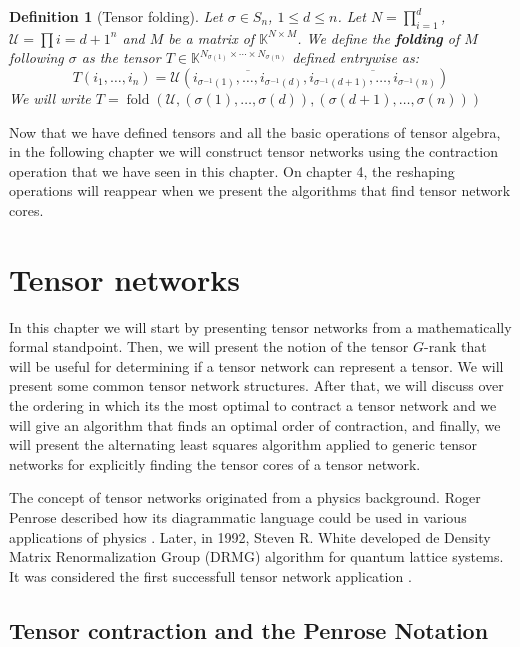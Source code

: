 \documentclass[11pt,a4paper,openright,oneside]{book}
\numberwithin{equation}{section}
\newtheorem{defn0}{Definition}[chapter]
\newenvironment{definition}{ \begin{defn0}}{\end{defn0}}
\DeclareMathOperator{\folding}{fold}
\begin{document}
\begin{definition}[Tensor folding]
    Let $\sigma \in S_n$, $1 \leqslant d \leqslant n$. Let $N = \prod_{i=1}^d$, $\mathcal{U} = \prod{i=d+1}^n$ and $M$ be a matrix of $\mathbb{K}^{N \times M}$.
    We define the \textbf{folding} of $M$ following $\sigma$ as the tensor $T \in \mathbb{K}^{N_{\sigma(1)} \times \cdots \times N_{\sigma(n)}}$ defined entrywise as:
    $$T(i_1, \dots, i_n) = \mathcal{U}(\overline{i_{\sigma^{-1}(1)}, \dots, i_{\sigma^{-1}(d)}}, \overline{i_{\sigma^{-1}(d+1)}, \dots, i_{\sigma^{-1}(n)}})$$
    We will write $T = \folding(\mathcal{U}, (\sigma(1), \dots, \sigma(d)), (\sigma(d+1), \dots, \sigma(n)))$
\end{definition}

Now that we have defined tensors and all the basic operations of tensor algebra, in the following chapter we will
construct tensor networks using the contraction operation that we have seen in this chapter. On chapter 4, the reshaping
operations will reappear when we present the algorithms that find tensor network cores.

\chapter{Tensor networks}

In this chapter we will start by presenting tensor networks from a mathematically formal standpoint. Then, we will present the notion
of the tensor $G$-rank that will be useful for determining if a tensor network can represent a tensor. We will present some common
tensor network structures. After that, we will discuss over the ordering in which its the most optimal to contract a tensor network
and we will give an algorithm that finds an optimal order of contraction, and finally, we will present the alternating least
squares algorithm applied to generic tensor networks for explicitly finding the tensor cores of a tensor network.

The concept of tensor networks originated from a physics background. Roger Penrose described how its
diagrammatic language could be used in various applications of physics \cite{rogerPenroseApplications}. Later, 
in 1992, Steven R. White developed de Density Matrix Renormalization Group (DRMG) algorithm for
quantum lattice systems. It was considered the first successfull tensor network application \cite{whiteDensityMatrixFormulation1992}.



\section{Tensor contraction and the Penrose Notation}
\end{document}
